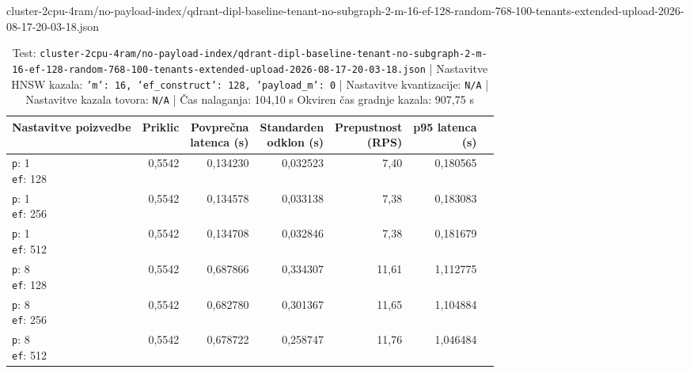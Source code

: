 \begin{table}[htbp]
  \centering
\small
  \caption{cluster-2cpu-4ram/no-payload-index/qdrant-dipl-baseline-tenant-no-subgraph-2-m-16-ef-128-random-768-100-tenants-extended-upload-2026-08-17-20-03-18.json}
  \label{tab:cluster-2cpu-4ram:no-payload-index:qdrant-dipl-baseline-tenant-no-subgraph-2-m-16-ef-128-random-768-100-tenants-extended-upload-2026-08-17-20-03-18.json}
  \begin{tabularx}{\textwidth}{Xrrrrrr}
    \toprule
    Nastavitve poizvedbe & Priklic & \makecell{Povprečna\\latenca (s)} & \makecell{Standarden\\odklon (s)} & \makecell{Prepustnost\\(RPS)} & \makecell{p95 latenca\\(s)}  \\
    \midrule
    \makecell{\texttt{p}: 1\\\texttt{ef}: 128} & 0,5542 & 0,134230 & 0,032523 & 7,40 & 0,180565 \\
    \makecell{\texttt{p}: 1\\\texttt{ef}: 256} & 0,5542 & 0,134578 & 0,033138 & 7,38 & 0,183083 \\
    \makecell{\texttt{p}: 1\\\texttt{ef}: 512} & 0,5542 & 0,134708 & 0,032846 & 7,38 & 0,181679 \\
    \makecell{\texttt{p}: 8\\\texttt{ef}: 128} & 0,5542 & 0,687866 & 0,334307 & 11,61 & 1,112775 \\
    \makecell{\texttt{p}: 8\\\texttt{ef}: 256} & 0,5542 & 0,682780 & 0,301367 & 11,65 & 1,104884 \\
    \makecell{\texttt{p}: 8\\\texttt{ef}: 512} & 0,5542 & 0,678722 & 0,258747 & 11,76 & 1,046484 \\
    \bottomrule
  \end{tabularx}
\caption* {Test: \texttt{cluster-2cpu-4ram/no-payload-index/qdrant-dipl-baseline-tenant-no-subgraph-2-m-16-ef-128-random-768-100-tenants-extended-upload-2026-08-17-20-03-18.json} | Nastavitve HNSW kazala: \texttt{{'m': 16, 'ef\_construct': 128, 'payload\_m': 0}} | Nastavitve kvantizacije: \texttt{N/A} | Nastavitve kazala tovora: \texttt{N/A} | Čas nalaganja: 104,10 s Okviren čas gradnje kazala: 907,75 s}\end{table}


